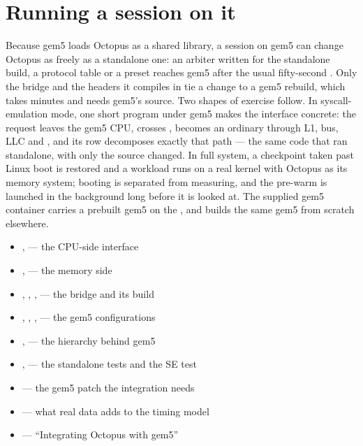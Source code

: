 \section{Running a session on it}

Because gem5 loads Octopus as a shared library, a session on gem5 can change Octopus as freely
as a standalone one: an arbiter written for the standalone build, a protocol table or a preset
reaches gem5 after the usual fifty-second . Only the bridge and the
headers it compiles in tie a change to a gem5 rebuild, which takes minutes and needs gem5's
source. Two shapes of exercise follow. In syscall-emulation mode, one short program under gem5
makes the interface concrete: the request leaves the gem5 CPU, crosses , becomes an ordinary
 through L1, bus, LLC and , and its  row
decomposes exactly that path --- the same code that ran standalone, with only the source
changed. In full system, a checkpoint taken past Linux boot is restored and a workload runs on a
real kernel with Octopus as its memory system; booting is separated from measuring, and the
pre-warm is launched in the background long before it is looked at. The supplied gem5
container carries a prebuilt gem5 on the , and  builds
the same gem5 from scratch elsewhere.

\begin{wherebox}
\begin{itemize}[nosep,leftmargin=1.2em]
\item {},  --- the CPU-side interface
\item {},  --- the memory side
\item {}, , ,  --- the bridge and its build
\item {}, , ,  --- the gem5 configurations
\item {},  --- the hierarchy behind gem5
\item {},  --- the standalone tests and the SE test
\item {} --- the gem5 patch the integration needs
\item {} --- what real data adds to the timing model
\item {} --- ``Integrating Octopus with gem5''
\end{itemize}
\end{wherebox}
